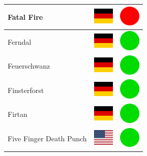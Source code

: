 \documentclass[12pt, a4paper, twoside]{report}
\begin{document}
\begin{center}
\begin{longtable}{|p{5cm}|p{2cm}|p{2cm}|}
 Fatal Fire                                                 & \includegraphics[width=1cm]{../4x3/de} &   \includegraphics[width=1cm]{../likes/n} \\ \hline
 Ferndal                                                    & \includegraphics[width=1cm]{../4x3/de} &   \includegraphics[width=1cm]{../likes/y} \\ \hline
 Feuerschwanz                                               & \includegraphics[width=1cm]{../4x3/de} &   \includegraphics[width=1cm]{../likes/y} \\ \hline
 Finsterforst                                               & \includegraphics[width=1cm]{../4x3/de} &   \includegraphics[width=1cm]{../likes/y} \\ \hline
 Firtan                                                     & \includegraphics[width=1cm]{../4x3/de} &   \includegraphics[width=1cm]{../likes/y} \\ \hline
 Five Finger Death Punch                                    & \includegraphics[width=1cm]{../4x3/us} &   \includegraphics[width=1cm]{../likes/y} \\ \hline

\end{longtable}
\end{center}
\end{document}
